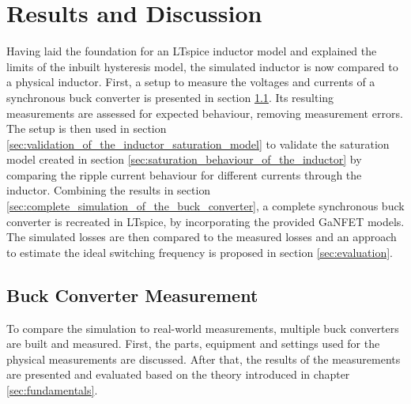 
\chapter{Results and Discussion}
\label{sec:cha4}
Having laid the foundation for an LTspice inductor model and explained the limits of the inbuilt hysteresis model, the simulated inductor is now compared to a physical inductor. First, a setup to measure the voltages and currents of a synchronous buck converter is presented in section \ref{sec:buck_converter_measurement}. Its resulting measurements are assessed for expected behaviour, removing measurement errors. The setup is then used in section \ref{sec:validation_of_the_inductor_saturation_model} to validate the saturation model created in section \ref{sec:saturation_behaviour_of_the_inductor} by comparing the ripple current behaviour for different currents through the inductor. Combining the results in section \ref{sec:complete_simulation_of_the_buck_converter}, a complete synchronous buck converter is recreated in LTspice, by incorporating the provided \ac{GaNFET} models. The simulated losses are then compared to the measured losses and an approach to estimate the ideal switching frequency is proposed in section \ref{sec:evaluation}. 

\section{Buck Converter Measurement}\label{sec:buck_converter_measurement}
To compare the simulation to real-world measurements, multiple buck converters are built and measured. First, the parts, equipment and settings used for the physical measurements are discussed. After that, the results of the measurements are presented and evaluated based on the theory introduced in chapter \ref{sec:fundamentals}.
